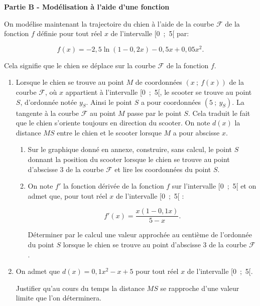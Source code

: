 \documentclass[10pt]{article}
\begin{document}
\bigskip
 
\textbf{Partie B - Modélisation à l'aide d'une fonction}
 
 \medskip
 
On modélise maintenant la trajectoire du chien à l'aide de la courbe $\mathcal{F}$ de la fonction $f$ définie
pour tout réel $x$ de l'intervalle [0~;~5[ par:
 
\[f(x) = -2,5\ln (1 - 0, 2x) - 0,5x + 0,05x^2.\]
 
 \medskip
 
Cela signifie que le chien se déplace sur la courbe $\mathcal{F}$ de la fonction $f$.
 
 \medskip
 
\begin{enumerate}
\item Lorsque le chien se trouve au point $M$ de coordonnées $(x~;~f(x))$ de la courbe $\mathcal{F}$, où $x$  appartient à l'intervalle [0~;~5[, le scooter se trouve au point $S$, d'ordonnée notée $y_S$. Ainsi le point $S$
a pour coordonnées $\left(5~;~y_S\right)$. La tangente à la courbe $\mathcal{F}$ au point $M$ passe par le point $S$. Cela traduit le fait que le chien s'oriente toujours en direction du scooter. On note $d(x)$ la distance $MS$ entre le chien et le scooter lorsque $M$ a pour abscisse $x$.
	\begin{enumerate}
		\item Sur le graphique  donné en annexe, construire, sans calcul, le point $S$ donnant la position du scooter lorsque le chien se trouve au point d'abscisse 3 de la courbe $\mathcal{F}$ et lire les
coordonnées du point $S$.
		\item On note $f'$ la fonction dérivée de la fonction $f$ sur l'intervalle [0~;~5[ et on admet que, pour tout réel $x$ de l'intervalle [0~;~5[ :

\[f'(x) = \dfrac{x(1  - 0,1x)}{5 - x}.\]

Déterminer par le calcul une valeur approchée au centième de l'ordonnée du point $S$ lorsque
le chien se trouve au point d'abscisse 3 de la courbe $\mathcal{F}$.
	\end{enumerate}
\item  On admet que $d(x) = 0,1x^2 - x + 5$ pour tout réel $x$ de l'intervalle [0~;~5[.

Justifier qu'au cours du temps la distance $MS$ se rapproche d'une valeur limite que l'on déterminera.
\end{enumerate}

\vspace{0,5cm}
\end{document}
